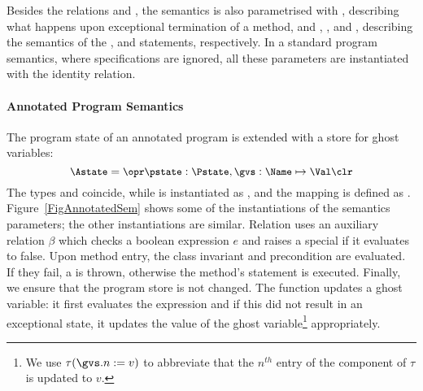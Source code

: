 Besides the relations \gammain and \gammanorm, the semantics
is also parametrised with
\gammaexc, describing what happens upon exceptional termination of a
method, and \deltaset, \deltacase, and \deltaassert, describing the
semantics of the \Set, \CaseJML and \Assert statements,
respectively. In a standard program semantics, where specifications
are ignored, all these parameters are instantiated %
with the identity relation.



\paragraph{Annotated Program Semantics}

The program state of an annotated program is extended with a store for
ghost variables:
\[{\small
\Astate = \opr \pstate : \Pstate, \gvs : \Name \mapsto \Val \clr}
\]
The types \FullProgram and \Program coincide, while \FullState is
instantiated as \Astate, and the mapping \progstate is defined as
\pstate. Figure~\ref{FigAnnotatedSem} shows some of the
instantiations of the semantics parameters; %
the other instantiations are similar. Relation \gammain uses an
auxiliary relation \(\beta\) which checks a boolean expression \(e\) and
raises a special \JMLExc if it evaluates to false. Upon method
entry, the class invariant and precondition are evaluated. If they
fail, a \JMLExc is thrown, otherwise the method's \preset statement is
executed. Finally, we ensure that the program store is not changed.
The function
\deltaset updates a ghost variable: it first evaluates the expression
and if this did not result in an exceptional state, it updates the
value of the ghost variable\footnote{We use \(\tau(\gvs.n := v)\) to
abbreviate that the \(n^{th}\) entry of the \gvs component of \(\tau\) is
updated to \(v\).} appropriately.

